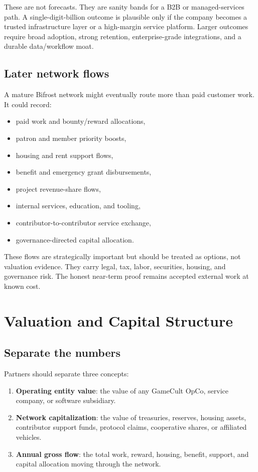 \documentclass[11pt,oneside]{report}
\newcommand{\term}[1]{\textbf{#1}}
\begin{document}
These are not forecasts. They are sanity bands for a B2B or managed-services path. A single-digit-billion outcome is plausible only if the company becomes a trusted infrastructure layer or a high-margin service platform. Larger outcomes require broad adoption, strong retention, enterprise-grade integrations, and a durable data/workflow moat.

\section{Later network flows}

A mature Bifrost network might eventually route more than paid customer work. It could record:

\begin{itemize}
  \item paid work and bounty/reward allocations,
  \item patron and member priority boosts,
  \item housing and rent support flows,
  \item benefit and emergency grant disbursements,
  \item project revenue-share flows,
  \item internal services, education, and tooling,
  \item contributor-to-contributor service exchange,
  \item governance-directed capital allocation.
\end{itemize}

These flows are strategically important but should be treated as options, not valuation evidence. They carry legal, tax, labor, securities, housing, and governance risk. The honest near-term proof remains accepted external work at known cost.

\chapter{Valuation and Capital Structure}

\section{Separate the numbers}

Partners should separate three concepts:

\begin{enumerate}
  \item \term{Operating entity value}: the value of any GameCult OpCo, service company, or software subsidiary.
  \item \term{Network capitalization}: the value of treasuries, reserves, housing assets, contributor support funds, protocol claims, cooperative shares, or affiliated vehicles.
  \item \term{Annual gross flow}: the total work, reward, housing, benefit, support, and capital allocation moving through the network.
\end{enumerate}
\end{document}
